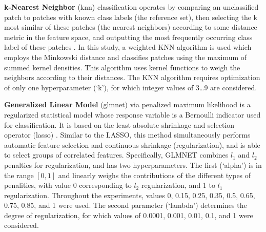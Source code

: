 {\bf k-Nearest Neighbor} (\gls{knn}) classification operates by comparing an unclassified patch to patches with known class labels (the reference set), then selecting the k most similar of these patches (the nearest neighbors) according to some distance metric in the feature space, and outputting the most frequently occurring class label of these patches \cite{cover1967nearest}. In this study, a weighted KNN algorithm is used \cite{hechenbichler2004weighted, samworth2012optimal} which employs the Minkowski distance and classifies patches using the maximum of summed kernel densities. This algorithm uses kernel functions to weigh the neighbors according to their distances. The KNN algorithm requires optimization of only one hyperparameter (`k'), for which integer values of 3\dots9 are considered.

{\bf Generalized Linear Model} (\gls{glmnet}) via penalized maximum likelihood \cite{friedman2010regularization} is a regularized statistical model whose response variable is a Bernoulli indicator used for classification. It is based on the least absolute shrinkage and selection operator (\gls{lasso}) \cite{tibshirani1996regression}. Similar to the LASSO, this method simultaneously performs automatic feature selection and continuous shrinkage (regularization), and is able to select groups of correlated features. Specifically, GLMNET combines $l_1$ and $l_2$ penalties for regularization, and has two hyperparameters. The first (`alpha') is in the range $[0,1]$ and linearly weighs the contributions of the different types of penalities, with value 0 corresponding to $l_2$ regularization, and 1 to $l_1$ regularization. Throughout the experiments, values 0, 0.15, 0.25, 0.35, 0.5, 0.65, 0.75, 0.85, and 1 were used. The second parameter (`lambda') determines the degree of regularization, for which values of 0.0001, 0.001, 0.01, 0.1, and 1 were considered.

